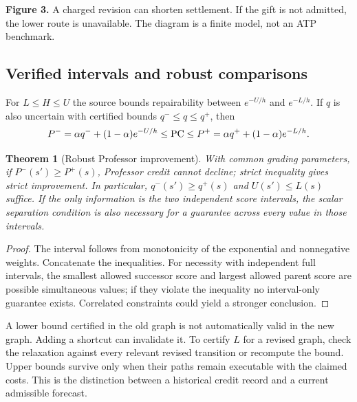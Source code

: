 \documentclass[11pt]{article}
\newtheorem{theorem}{Theorem}[section]\newtheorem{proposition}[theorem]{Proposition}\newtheorem{lemma}[theorem]{Lemma}\newtheorem{corollary}[theorem]{Corollary}
\theoremstyle{definition}\newtheorem{definition}[theorem]{Definition}\newtheorem{conjecture}[theorem]{Conjecture}\newtheorem{example}[theorem]{Example}
\begin{document}
\begin{center}
\end{center}
\textbf{Figure 3.} A charged revision can shorten settlement. If the gift is not admitted, the lower route is unavailable. The diagram is a finite model, not an ATP benchmark.

\subsection{Verified intervals and robust comparisons}
For $L\le H\le U$ the source bounds repairability between $e^{-U/h}$ and $e^{-L/h}$. If $q$ is also uncertain with certified bounds $q^-\le q\le q^+$, then
\[
 P^-=\alpha q^-+(1-\alpha)e^{-U/h}\le\operatorname{PC}\le
 P^+=\alpha q^++(1-\alpha)e^{-L/h}.
\]
\begin{theorem}[Robust Professor improvement]
With common grading parameters, if $P^-(s')\ge P^+(s)$, Professor credit cannot decline; strict inequality gives strict improvement. In particular, $q^-(s')\ge q^+(s)$ and $U(s')\le L(s)$ suffice. If the only information is the two independent score intervals, the scalar separation condition is also necessary for a guarantee across every value in those intervals.
\end{theorem}
\begin{proof}The interval follows from monotonicity of the exponential and nonnegative weights. Concatenate the inequalities. For necessity with independent full intervals, the smallest allowed successor score and largest allowed parent score are possible simultaneous values; if they violate the inequality no interval-only guarantee exists. Correlated constraints could yield a stronger conclusion.\end{proof}
A lower bound certified in the old graph is not automatically valid in the new graph. Adding a shortcut can invalidate it. To certify $L$ for a revised graph, check the relaxation against every relevant revised transition or recompute the bound. Upper bounds survive only when their paths remain executable with the claimed costs. This is the distinction between a historical credit record and a current admissible forecast.
\end{document}
